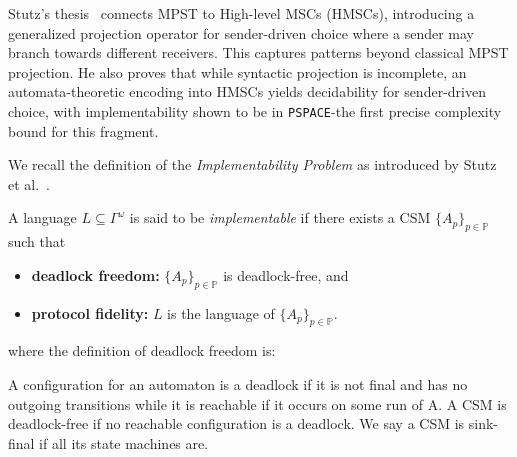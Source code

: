 Stutz’s thesis~\cite{stutz2024implementability} connects MPST to 
High-level MSCs (HMSCs), introducing a generalized projection operator 
for sender-driven choice where a sender may branch towards different 
receivers. This captures patterns beyond classical MPST projection.  
He also proves that while syntactic projection is incomplete, 
an automata-theoretic encoding into HMSCs yields decidability for 
sender-driven choice, with implementability shown to be in 
\verb|PSPACE|-the first precise complexity bound for this fragment.

We recall the definition of the \emph{Implementability Problem} as 
introduced by Stutz et al.~\cite{stutz2024implementability}.  

\bigskip

\begin{definition}
A language $L \subseteq \Gamma^\omega$ is said to be 
\emph{implementable} if there exists a CSM 
$\{A_p\}_{p \in \mathbb{P}}$ such that
\begin{itemize}
    \item \textbf{deadlock freedom:} 
    $\{A_p\}_{p \in \mathbb{P}}$ is deadlock-free, and
    \item \textbf{protocol fidelity:} 
    $L$ is the language of $\{A_p\}_{p \in \mathbb{P}}$.
\end{itemize}
\end{definition}

where the definition of deadlock freedom is:

\bigskip

\begin{definition}
A configuration for an automaton is a deadlock if it is not final and  
has no outgoing transitions while it is reachable if it occurs on some 
run of A. A CSM is deadlock-free if no reachable configuration is a
deadlock. We say a CSM is sink-final if all its state machines are.
\end{definition}

